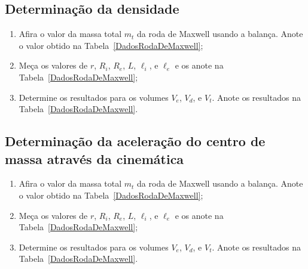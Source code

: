 \subsection{Determinação da densidade}
\begin{enumerate}
	\item Afira o valor da massa total $m_t$ da roda de Maxwell usando a balança. Anote o valor obtido na Tabela~\ref{DadosRodaDeMaxwell};
	\item Meça os valores de $r$, $R_i$, $R_e$, $L$, $\ell_i$, e $\ell_e$ e os anote na Tabela~\ref{DadosRodaDeMaxwell};
	\item Determine os resultados para os volumes $V_e$, $V_d$, e $V_t$. Anote os resultados na Tabela~\ref{DadosRodaDeMaxwell}.
\end{enumerate}

\subsection{Determinação da aceleração do centro de massa através da cinemática}
\begin{enumerate}
	\item Afira o valor da massa total $m_t$ da roda de Maxwell usando a balança. Anote o valor obtido na Tabela~\ref{DadosRodaDeMaxwell};
	\item Meça os valores de $r$, $R_i$, $R_e$, $L$, $\ell_i$, e $\ell_e$ e os anote na Tabela~\ref{DadosRodaDeMaxwell};
	\item Determine os resultados para os volumes $V_e$, $V_d$, e $V_t$. Anote os resultados na Tabela~\ref{DadosRodaDeMaxwell}.
\end{enumerate}

\cleardoublepage


\vspace{15mm}

